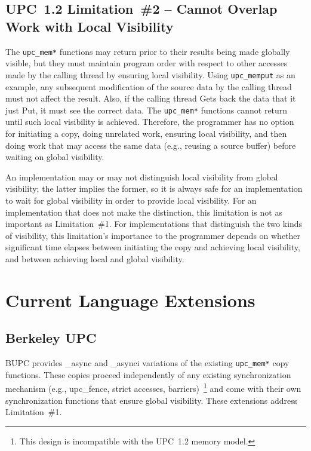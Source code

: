 \documentclass[10pt]{article}
\def \memput  {{\tt upc\_memput}}
\def \memstar {{\tt upc\_mem*}}
\begin{document}
\subsection{UPC~1.2 Limitation~\#2 -- Cannot Overlap Work with Local Visibility}

The \memstar{} functions may return prior to their results being made globally
visible, but they must maintain program order with respect to other accesses
made by the calling thread by ensuring local visibility.  Using \memput{} as an
example, any subsequent modification of the source data by the calling thread
must not affect the result.  Also, if the calling thread Gets back the data that
it just Put, it must see the correct data.  The \memstar{} functions cannot
return until such local visibility is achieved.  Therefore, the programmer has
no option for initiating a copy, doing unrelated work, ensuring local
visibility, and then doing work that may access the same data (e.g., reusing a
source buffer) before waiting on global visibility.

An implementation may or may not distinguish local visibility from global
visibility; the latter implies the former, so it is always safe for an
implementation to wait for global visibility in order to provide local
visibility.  For an implementation that does not make the distinction, this
limitation is not as important as Limitation~\#1.  For implementations that
distinguish the two kinds of visibility, this limitation's importance to the
programmer depends on whether significant time elapses between initiating the
copy and achieving local visibility, and between achieving local and global
visibility.

\section{Current Language Extensions} 

\subsection{Berkeley UPC}

BUPC provides \_async and \_asynci variations of the existing \memstar{} copy
functions.  These copies proceed independently of any existing synchronization
mechanism (e.g., upc\_fence, strict accesses, barriers)~\footnote{This design is
incompatible with the UPC~1.2 memory model.} and come with their own
synchronization functions that ensure global visibility.  These extensions
address Limitation~\#1.
\end{document}
